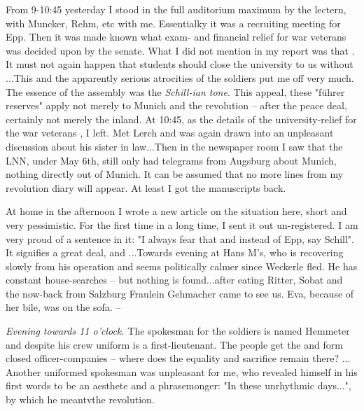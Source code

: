 
From 9-10:45 yesterday I stood in the full auditorium maximum by the lectern, with Muncker, Rehm, etc with me. Essentialky it was a recruiting meeting for Epp. Then it was made known what exam- and financial relief for war veterans was decided upon by the senate. What I did not mention in my report was that . It must not again happen that  students should close the university to us without ...This and the apparently serious atrocities of the soldiers put me off very much. The essence of the assembly was the \textit{Schill-ian tone}. This appeal, these "führer reserves" apply not merely to Munich and the revolution -- after the peace deal, certainly not merely the inland. At 10:45, as the details of the university-relief for the war veterans , I left. Met Lerch and was again drawn into an unpleasant discussion about his sister in law...Then in the newspaper room I saw that the LNN, under May 6th, still only had telegrams from Augsburg about Munich, nothing directly out of Munich. It can be assumed that no more lines from my revolution diary will appear. At least I got the manuscripts back.

At home in the afternoon I wrote a new article on the situation here, short and very pessimistic. For the first time in a long time, I sent it out un-registered. I am very proud of a sentence in it: "I always fear that  and instead of Epp, say Schill". It signifies a great deal, and ...Towards evening at Hans M's, who is recovering slowly from his operation and seems politically calmer since Weckerle fled. He has constant house-searches -- but nothing is found...after eating Ritter, Sobat and the now-back from Salzburg Fraulein Gehmacher came to see us. Eva, because of her bile, was on the sofa. --

\textit{Evening towards 11 o'clock.} The spokesman for the soldiers is named Hemmeter and despite his crew uniform is a first-lieutenant. The people get the  and form closed officer-companies -- where does the equality and sacrifice remain there? ... Another uniformed spokesman was unpleasant for me, who revealed himself in his first words to be an aesthete and a phrasemonger: "In these unrhythmic days...", by which he meantvthe revolution.

